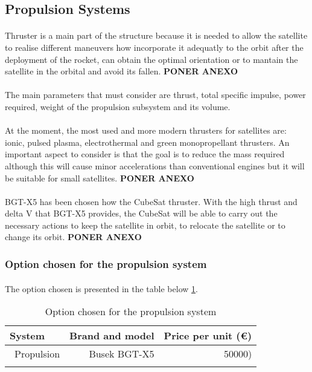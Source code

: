 \subsection{Propulsion Systems}

\paragraph{}
Thruster is a main part of the structure because it is needed to allow the satellite to realise different maneuvers how incorporate it adequatly to the orbit after the deployment of the rocket, can obtain the optimal orientation or to mantain the satellite in the orbital and avoid its fallen. \textbf{PONER ANEXO}

\paragraph{}
The main parameters that must consider are thrust, total specific impulse, power required, weight of the  propulsion subsystem and its volume.

\paragraph{}
At the moment, the most used and more modern thrusters for satellites are: ionic, pulsed plasma, electrothermal and green monopropellant thrusters. An important aspect to consider is that the goal is to reduce the mass required although this will cause minor accelerations than conventional engines but it will be suitable for small satellites. \textbf{PONER ANEXO}

\paragraph{}
BGT-X5 has been chosen how the CubeSat thruster. With the high thrust and delta V that BGT-X5 provides, the CubeSat will be able to carry out the necessary actions to keep the satellite in orbit, to relocate the satellite or to change its orbit. \textbf{PONER ANEXO}

\subsubsection{Option chosen for the propulsion system}

\paragraph{}The option chosen is presented in the table below \ref{propulsionfinal}.

\begin{longtable}{| l | r | r | }
\hline
\rowcolor[gray]{0.80}	\textbf{System} &  \textbf{Brand and model}     & \textbf{Price per unit (\euro)}   \\
\hline
\endfirsthead

	   ~Propulsion & Busek BGT-X5 & 50000) \\
	\hline

\caption{Option chosen for the propulsion system}
\label{propulsionfinal}
\end{longtable}
